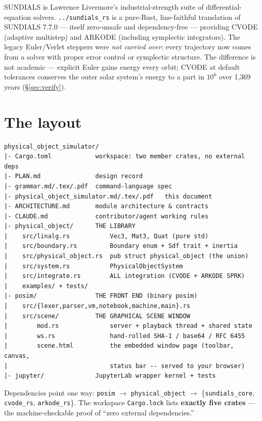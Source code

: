 \documentclass[11pt]{article}
\newcommand{\code}[1]{\texttt{#1}}
\begin{document}
SUNDIALS is Lawrence Livermore's industrial-strength suite of
differential-equation solvers. \code{../sundials\_rs} is a pure-Rust,
line-faithful translation of SUNDIALS 7.7.0 --- itself zero-unsafe and
dependency-free --- providing CVODE (adaptive multistep) and ARKODE
(including symplectic integrators). The legacy Euler/Verlet steppers
were \emph{not carried over}: every trajectory now comes from a solver
with proper error control or symplectic structure. The difference is not
academic --- explicit Euler gains energy every orbit; CVODE at default
tolerances conserves the outer solar system's energy to a part in
$10^{6}$ over 1{,}369 years (\S\ref{sec:verify}).

\section{The layout}

\begin{lstlisting}
physical_object_simulator/
|- Cargo.toml            workspace: two member crates, no external deps
|- PLAN.md               design record
|- grammar.md/.tex/.pdf  command-language spec
|- physical_object_simulator.md/.tex/.pdf   this document
|- ARCHITECTURE.md       module architecture & contracts
|- CLAUDE.md             contributor/agent working rules
|- physical_object/      THE LIBRARY
|    src/linalg.rs           Vec3, Mat3, Quat (pure std)
|    src/boundary.rs         Boundary enum + Sdf trait + inertia
|    src/physical_object.rs  pub struct physical_object (the union)
|    src/system.rs           PhysicalObjectSystem
|    src/integrate.rs        ALL integration (CVODE + ARKODE SPRK)
|    examples/ + tests/
|- posim/                THE FRONT END (binary posim)
|    src/{lexer,parser,vm,notebook,machine,main}.rs
|    src/scene/          THE GRAPHICAL SCENE WINDOW
|        mod.rs              server + playback thread + shared state
|        ws.rs               hand-rolled SHA-1 / base64 / RFC 6455
|        scene.html          the embedded window page (toolbar, canvas,
|                            status bar -- served to your browser)
|- jupyter/              JupyterLab wrapper kernel + tests
\end{lstlisting}

Dependencies point one way:
\code{posim} $\to$ \code{physical\_object} $\to$
\{\code{sundials\_core}, \code{cvode\_rs}, \code{arkode\_rs}\}. The
workspace \code{Cargo.lock} lists \textbf{exactly five crates} --- the
machine-checkable proof of ``zero external dependencies.''
\end{document}
